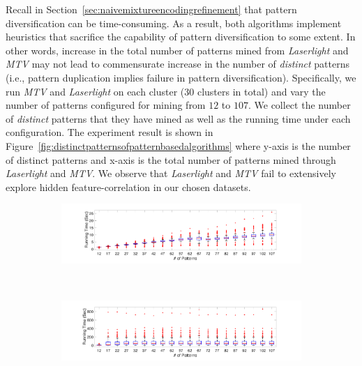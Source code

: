 Recall in Section~\ref{sec:naivemixtureencodingrefinement} that pattern diversification can be time-consuming.
As a result, both algorithms implement heuristics that sacrifice the capability of pattern diversification to some extent.
In other words, increase in the total number of patterns mined from \textit{Laserlight} and \textit{MTV} may not lead to commensurate increase in the number of \textit{distinct} patterns (i.e., pattern duplication implies failure in pattern diversification).
Specifically, we run \textit{MTV} and \textit{Laserlight} on each cluster ($30$ clusters in total) and vary the number of patterns configured for mining from $12$ to $107$.
We collect the number of \textit{distinct} patterns that they have mined as well as the running time under each configuration.
The experiment result is shown in Figure~\ref{fig:distinctpatternsofpatternbasedalgorithms} where y-axis is the number of distinct patterns and x-axis is the total number of patterns mined through \textit{Laserlight} and \textit{MTV}.
We observe that \textit{Laserlight} and \textit{MTV} fail to extensively explore hidden feature-correlation in our chosen datasets.

\begin{figure}[ht!]
	\captionsetup[subfigure]{justification=centering}
    \centering
    \begin{subfigure}[b]{0.48\textwidth}
        \centering       
        \includegraphics[width=\textwidth]{QueryLogSummarization/graphics/Laserlight_RunningTimeVNumPatterns.pdf}
 \label{fig:runningtime_laserlight}
\end{subfigure}
    ~
\begin{subfigure}[b]{0.48\textwidth}
  \centering       
  \includegraphics[width=\textwidth]{QueryLogSummarization/graphics/MTV_RunningTimeVNumPatterns.pdf}
 \label{fig:runningtime_MTV}
\end{subfigure}
~
   \label{fig:runningtimeofpatternbasedalgorithms}
\trimfigurewhitespace
\end{figure}

